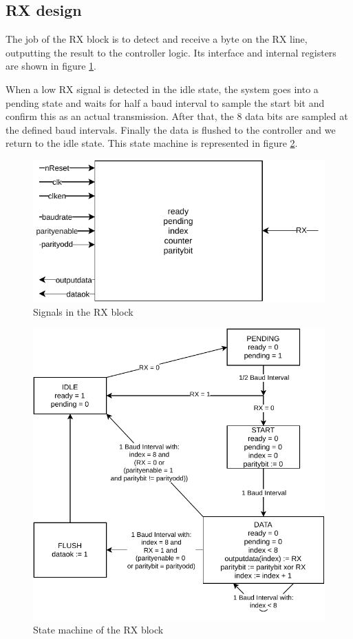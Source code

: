 \documentclass[12pt,a4paper]{article}
\begin{document}
\subsection{RX design}

The job of the RX block is to detect and receive a byte on the RX line, outputting the result to the controller logic. Its interface and internal registers are shown in figure \ref{fig:rx}.

When a low RX signal is detected in the idle state, the system goes into a pending state and waits for half a baud interval to sample the start bit and confirm this as an actual transmission. After that, the 8 data bits are sampled at the defined baud intervals. Finally the data is flushed to the controller and we return to the idle state. This state machine is represented in figure \ref{fig:smrx}.

\begin{figure}[ht]
	\centering
	\includegraphics[width=.7\textwidth]{rx}
	\caption{Signals in the RX block}
	\label{fig:rx}
\end{figure}

\begin{figure}[ht!]
	\centering
	\includegraphics[width=.8\textwidth]{smrx}
	\caption{State machine of the RX block}
	\label{fig:smrx}
\end{figure}
\end{document}
